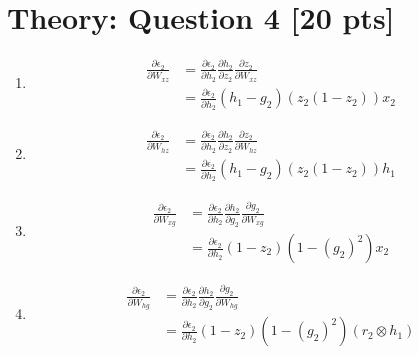 \documentclass{article}
\begin{document}
\section{Theory: Question 4 [20 pts]}

\begin{enumerate}[label=\alph*.]
    \item
    \begin{equation*}
        \begin{aligned}
            \frac{\partial \epsilon_2}{\partial W_{xz}} &= \frac{\partial \epsilon_2}{\partial h_2} \frac{\partial h_2}{\partial z_2} \frac{\partial z_2}{\partial W_{xz}} \\
            &= \frac{\partial \epsilon_2}{\partial h_2} (h_1 - g_2) (z_2(1-z_2)) x_2
        \end{aligned}
    \end{equation*}

    \item
    \begin{equation*}
        \begin{aligned}
            \frac{\partial \epsilon_2}{\partial W_{hz}} &= \frac{\partial \epsilon_2}{\partial h_2} \frac{\partial h_2}{\partial z_2} \frac{\partial z_2}{\partial W_{hz}} \\
            &= \frac{\partial \epsilon_2}{\partial h_2} (h_1 - g_2) (z_2(1-z_2)) h_1
        \end{aligned}
    \end{equation*}

    \item
    \begin{equation*}
        \begin{aligned}
            \frac{\partial \epsilon_2}{\partial W_{xg}} &= \frac{\partial \epsilon_2}{\partial h_2} \frac{\partial h_2}{\partial g_2} \frac{\partial g_2}{\partial W_{xg}} \\
            &= \frac{\partial \epsilon_2}{\partial h_2} (1-z_2)(1-(g_2)^2) x_2
        \end{aligned}
    \end{equation*}

    \item
    \begin{equation*}
        \begin{aligned}
            \frac{\partial \epsilon_2}{\partial W_{hg}} &= \frac{\partial \epsilon_2}{\partial h_2} \frac{\partial h_2}{\partial g_2} \frac{\partial g_2}{\partial W_{hg}} \\
            &= \frac{\partial \epsilon_2}{\partial h_2} (1-z_2)(1-(g_2)^2)(r_2 \otimes h_1)
        \end{aligned}
    \end{equation*}


\end{enumerate}
\end{document}
